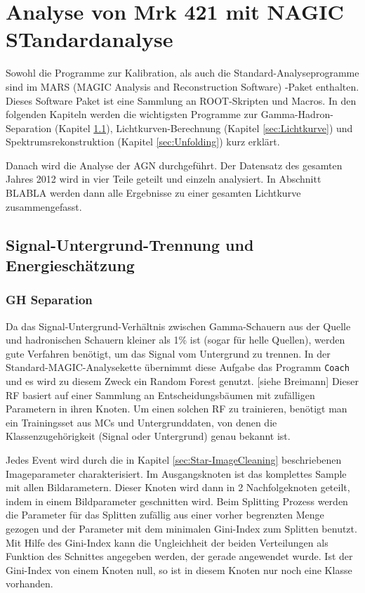 \chapter{Analyse von Mrk 421 mit NAGIC STandardanalyse}
Sowohl die Programme zur Kalibration, als auch die Standard-Analyseprogramme sind im MARS (MAGIC Analysis and Reconstruction Software) -Paket enthalten.
Dieses Software Paket ist eine Sammlung an ROOT-Skripten und Macros.
In den folgenden Kapiteln werden die wichtigsten Programme zur Gamma-Hadron-Separation (Kapitel \ref{sec:GH-Separation}), Lichtkurven-Berechnung (Kapitel \ref{sec:Lichtkurve}) und Spektrumsrekonstruktion (Kapitel \ref{sec:Unfolding}) kurz erklärt.

Danach wird die Analyse der AGN durchgeführt.
Der Datensatz des gesamten Jahres 2012 wird in vier Teile geteilt und einzeln analysiert. 
In Abschnitt BLABLA werden dann alle Ergebnisse zu einer gesamten Lichtkurve zusammengefasst.


\section{Signal-Untergrund-Trennung und Energieschätzung}
\label{sec:GH-Separation}
\subsection{GH Separation}
Da das Signal-Untergrund-Verhältnis zwischen Gamma-Schauern aus der Quelle und hadronischen Schauern kleiner als 1\% ist (sogar für helle Quellen), werden gute Verfahren benötigt, um das Signal vom Untergrund zu trennen.
In der Standard-MAGIC-Analysekette übernimmt diese Aufgabe das Programm \texttt{Coach} und es wird zu diesem Zweck ein Random Forest genutzt. [siehe Breimann]
Dieser RF basiert auf einer Sammlung an Entscheidungsbäumen mit zufälligen Parametern in ihren Knoten.
Um einen solchen RF zu trainieren, benötigt man ein Trainingsset aus MCs und Untergrunddaten, von denen die Klassenzugehörigkeit (Signal oder Untergrund) genau bekannt ist.

Jedes Event wird durch die in Kapitel \ref{sec:Star-ImageCleaning} beschriebenen Imageparameter charakterisiert.
Im Ausgangsknoten ist das komplettes Sample mit allen Bildarametern.
Dieser Knoten wird dann in 2 Nachfolgeknoten geteilt, indem in einem Bildparameter geschnitten wird.
Beim Splitting Prozess werden die  Parameter für das Splitten zufällig aus einer vorher begrenzten Menge gezogen und der Parameter mit dem minimalen Gini-Index zum Splitten benutzt.
Mit Hilfe des Gini-Index kann die Ungleichheit der beiden Verteilungen als Funktion des Schnittes angegeben werden, der gerade angewendet wurde.
Ist der Gini-Index von einem Knoten null, so ist in diesem Knoten nur noch eine Klasse vorhanden.

